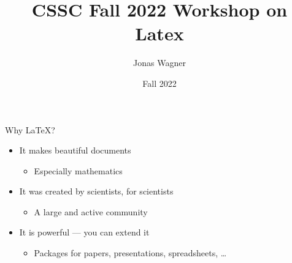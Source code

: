 \documentclass{beamer}
\title{CSSC Fall 2022 Workshop on Latex}
\author{Jonas Wagner}
\date{Fall 2022}
\begin{document}
    
\begin{frame}
    \titlepage
\end{frame}




\begin{frame}{Why \LaTeX{}?}
    \begin{itemize}
    \item It makes beautiful documents
    \begin{itemize}
    \item Especially mathematics
    \end{itemize}
    \item It was created by scientists, for scientists
    \begin{itemize}
    \item A large and active community
    \end{itemize}
    \item It is powerful --- you can extend it
    \begin{itemize}
    \item Packages for papers, presentations, spreadsheets, \ldots
    \end{itemize}
    \end{itemize}
    \end{frame}
    
\end{document}
